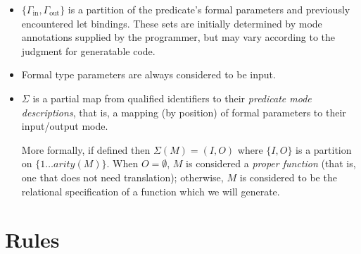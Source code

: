 \documentclass[11pt]{article}
\begin{document}
\begin{itemize}
\item \(\{\Gamma_{\text{in}}, \Gamma_{\text{out}}\}\) is a partition of the
predicate's formal parameters and previously encountered let bindings. These
sets are initially determined by mode annotations supplied by the programmer,
but may vary according to the judgment for generatable code.

\item Formal type parameters are always considered to be input.

\item \(\Sigma\) is a partial map from qualified identifiers to their \emph{predicate
mode descriptions}, that is, a mapping (by position) of formal parameters to
their input/output mode.

More formally, if defined then \(\Sigma(M) = (I,O)\) where \(\{I,O\}\) is a
partition on \(\{1 \ldots \mathit{arity}(M)\}\). When \(O = \emptyset\), \(M\)
is considered a \emph{proper function} (that is, one that does not need
translation); otherwise, \(M\) is considered to be the relational
specification of a function which we will generate.
\end{itemize}

\section{Rules}
\label{sec:orgddcea43}
\end{document}
